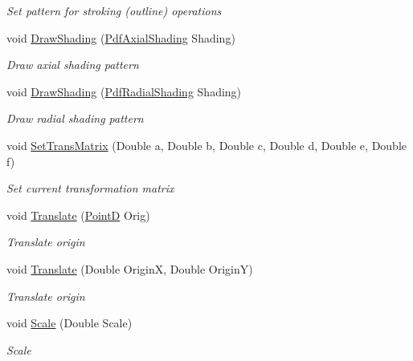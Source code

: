 \begin{DoxyCompactItemize}
\begin{DoxyCompactList}\small\item\em Set pattern for stroking (outline) operations \end{DoxyCompactList}\item 
void \hyperlink{class_pdf_file_writer_1_1_pdf_contents_a462bd6b2e747533ca2c0e137e9b268ba}{Draw\+Shading} (\hyperlink{class_pdf_file_writer_1_1_pdf_axial_shading}{Pdf\+Axial\+Shading} Shading)
\begin{DoxyCompactList}\small\item\em Draw axial shading pattern \end{DoxyCompactList}\item 
void \hyperlink{class_pdf_file_writer_1_1_pdf_contents_abf8bcd50342861d9b9391aaf0e87cf7d}{Draw\+Shading} (\hyperlink{class_pdf_file_writer_1_1_pdf_radial_shading}{Pdf\+Radial\+Shading} Shading)
\begin{DoxyCompactList}\small\item\em Draw radial shading pattern \end{DoxyCompactList}\item 
void \hyperlink{class_pdf_file_writer_1_1_pdf_contents_a2092d524ca9cde0242d4ed395f64629a}{Set\+Trans\+Matrix} (Double a, Double b, Double c, Double d, Double e, Double f)
\begin{DoxyCompactList}\small\item\em Set current transformation matrix \end{DoxyCompactList}\item 
void \hyperlink{class_pdf_file_writer_1_1_pdf_contents_a2962490160fc2044f9d1fb8d817ef81a}{Translate} (\hyperlink{class_pdf_file_writer_1_1_point_d}{PointD} Orig)
\begin{DoxyCompactList}\small\item\em Translate origin \end{DoxyCompactList}\item 
void \hyperlink{class_pdf_file_writer_1_1_pdf_contents_aaa74f5c07431b9ed8a8568273273c0dc}{Translate} (Double OriginX, Double OriginY)
\begin{DoxyCompactList}\small\item\em Translate origin \end{DoxyCompactList}\item 
void \hyperlink{class_pdf_file_writer_1_1_pdf_contents_af2d7cc040971ee1a57c0c5d3fbb888a5}{Scale} (Double Scale)
\begin{DoxyCompactList}\small\item\em Scale \end{DoxyCompactList}\item 

\end{DoxyCompactItemize}
